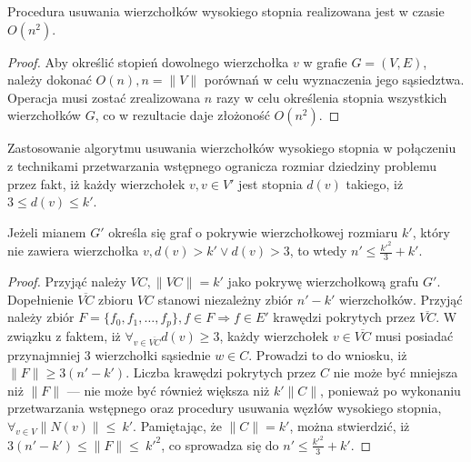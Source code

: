 \begin{theorem}
  Procedura usuwania wierzchołków wysokiego stopnia realizowana jest w czasie
  $O(n^2)$.
\end{theorem}
\begin{proof}
  Aby określić stopień dowolnego wierzchołka $v$ w grafie $G=(V,E)$, należy 
  dokonać $O(n), n=\|V\|$ porównań w celu wyznaczenia jego sąsiedztwa.
  Operacja musi zostać zrealizowana $n$ razy w celu określenia stopnia
  wszystkich wierzchołków $G$, co w rezultacie daje złożoność $O (n^2)$.
\end{proof}

Zastosowanie algorytmu usuwania wierzchołków wysokiego stopnia w połączeniu z
technikami przetwarzania wstępnego ogranicza rozmiar dziedziny problemu przez
fakt, iż każdy wierzchołek $v, v \in V\prime$ jest stopnia $d(v)$ takiego, iż
$3 \leq d(v) \leq k\prime$.

\begin{theorem}
  Jeżeli mianem $G\prime$ określa się graf o pokrywie wierzchołkowej rozmiaru
  $k\prime$, który nie zawiera wierzchołka $v, d(v) > k\prime \lor d(v) > 3$, to
  wtedy $n\prime \leq \frac{k\prime^2}{3} + k\prime$.
\end{theorem}
\begin{proof}
  Przyjąć należy ${VC,\|VC\|=k\prime}$ jako pokrywę wierzchołkową grafu
  $G\prime$.
  Dopełnienie $\overline{VC}$ zbioru $VC$ stanowi niezależny zbiór
  $n\prime-k\prime$ wierzchołków.
  Przyjąć należy zbiór $F=\{f_0,f_1, \ldots, f_p\}, f \in F \Rightarrow f \in E\prime$
  krawędzi pokrytych przez $\overline{VC}$.
  W związku z faktem, iż $\forall_{v \in \overline{VC}}{d(v) \geq 3}$, każdy
  wierzchołek $v \in \overline{VC}$ musi posiadać przynajmniej 3 wierzchołki sąsiednie
  $w \in C$.
  Prowadzi to do wniosku, iż $\|F\| \geq 3(n\prime - k\prime)$.
  Liczba krawędzi pokrytych przez $C$ nie może być mniejsza niż $\|F\|$ --- nie
  może być również większa niż $k\prime\|C\|$, ponieważ po wykonaniu
  przetwarzania wstępnego oraz procedury usuwania węzłów wysokiego stopnia,
  $\forall_{v \in V}{\|N(v)\|\leq~k\prime}$.
  Pamiętając, że $\|C\|=k\prime$, można stwierdzić, iż
  ${3(n\prime-k\prime)\leq\|F\|\leq~k\prime^2}$, co sprowadza się do
  ${n\prime\leq\frac{k\prime^2}{3}+k\prime}$.
\end{proof}


